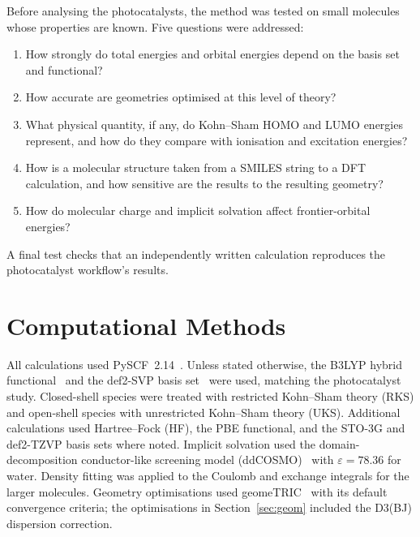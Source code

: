 \documentclass[11pt,a4paper]{article}
\begin{document}
Before analysing the photocatalysts, the method was tested on small molecules whose properties are
known. Five questions were addressed:
\begin{enumerate}
  \item How strongly do total energies and orbital energies depend on the basis set and functional?
  \item How accurate are geometries optimised at this level of theory?
  \item What physical quantity, if any, do Kohn--Sham HOMO and LUMO energies represent, and how do
  they compare with ionisation and excitation energies?
  \item How is a molecular structure taken from a SMILES string to a DFT calculation, and how
  sensitive are the results to the resulting geometry?
  \item How do molecular charge and implicit solvation affect frontier-orbital energies?
\end{enumerate}
A final test checks that an independently written calculation reproduces the photocatalyst
workflow's results.

\section{Computational Methods}

All calculations used PySCF~2.14~\cite{pyscf2020}. Unless stated otherwise, the B3LYP hybrid
functional~\cite{becke1993,lee1988} and the def2-SVP basis set~\cite{weigend2005} were used,
matching the photocatalyst study. Closed-shell species were treated with restricted Kohn--Sham
theory (RKS) and open-shell species with unrestricted Kohn--Sham theory (UKS). Additional
calculations used Hartree--Fock (HF), the PBE functional, and the STO-3G and def2-TZVP basis sets
where noted. Implicit solvation used the domain-decomposition conductor-like screening model
(ddCOSMO)~\cite{cances2013} with $\varepsilon = 78.36$ for water. Density fitting was applied to
the Coulomb and exchange integrals for the larger molecules. Geometry optimisations used
geomeTRIC~\cite{wang2016} with its default convergence criteria; the optimisations in
Section~\ref{sec:geom} included the D3(BJ) dispersion correction.
\end{document}

